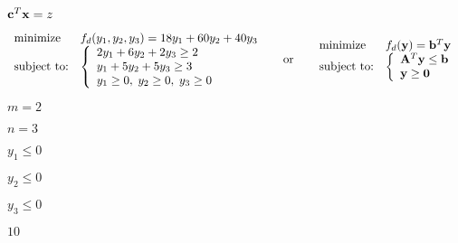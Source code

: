 \documentclass{article}
\def\lthtmlcheckvsize{\ifdim\ht\sizebox<\vsize 
  \ifdim\wd\sizebox<\hsize\expandafter\hfill\fi \expandafter\vfill
  \else\expandafter\vss\fi}%
\begin{document}
{\newpage\clearpage
{}%
$ {\bf c}^T{\bf x}=z$%
\lthtmlindisplaymathZ
\lthtmlcheckvsize\clearpage}

{\newpage\clearpage
{}%
\begin{displaymath}\begin{array}{ll}
\mbox{minimize}    & f_d(y_1,y_2,y_3)=18y_1+60y_2+40y_3 \\
\mbox{subject to:} &
\left\{ \begin{array}{l}
2y_1+6y_2+2y_3\ge 2 \\y_1+5y_2+5y_3\ge 3\\
y_1\ge 0,\;y_2\ge 0,\;y_3\ge 0\\
\end{array}\right.
\end{array}
\;\;\;\;\;\;\mbox{or}\;\;\;\;\;\;
\begin{array}{ll}
\mbox{minimize}    & f_d({\bf y})={\bf b}^T{\bf y} \\
\mbox{subject to:} &
\left\{ \begin{array}{l}{\bf A}^T{\bf y}\le{\bf b}\\{\bf y}\ge {\bf0}
\end{array}\right.
\end{array}\end{displaymath}%
\lthtmldisplayZ
\lthtmlcheckvsize\clearpage}

{\newpage\clearpage
{}%
$ m=2$%
\lthtmlindisplaymathZ
\lthtmlcheckvsize\clearpage}

{\newpage\clearpage
{}%
$ n=3$%
\lthtmlindisplaymathZ
\lthtmlcheckvsize\clearpage}

{\newpage\clearpage
{}%
$ y_1\le 0$%
\lthtmlindisplaymathZ
\lthtmlcheckvsize\clearpage}

{\newpage\clearpage
{}%
$ y_2\le 0$%
\lthtmlindisplaymathZ
\lthtmlcheckvsize\clearpage}

{\newpage\clearpage
{}%
$ y_3\le 0$%
\lthtmlindisplaymathZ
\lthtmlcheckvsize\clearpage}

{\newpage\clearpage
{}%
$ 10$%
\lthtmlindisplaymathZ
\lthtmlcheckvsize\clearpage}
\end{document}
